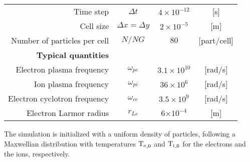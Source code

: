\begin{table}[htbp]
\begin{tabular}{@{}r c c c@{}}
          Time step & $\Delta t  $                      & $4 \times 10^{-12}$ & [{s}] \\
          Cell size & $\Delta x = \Delta y$ & $2 \times 10^{-5}$  & [{m}] \\
          Number of particles per cell & $N/NG      $                      & $80$                & [{part/cell}] \\
          \midrule
          {\bf Typical quantities} &  &  &  \\ 
          Electron plasma frequency & $\omega_{pe}$               & $3.1 \times 10^{10} $  & [rad/s]\\
          Ion plasma frequency & $\omega_{pi}$               & $36 \times 10^{6} $  & [rad/s]\\
          Electron cyclotron frequency & $\omega_{ce}$               &  $3.5\times 10^{9}$  & [rad/s] \\
          Electron Larmor radius & $r_{Le}$                    & 6$\times 10^{-4}$    & [m] \\
          \bottomrule
       \end{tabular}
    \end{table}
    
  
  The simulation is initialized with a uniform density of particles, following a Maxwellian distribution with temperatures $\mathrm{T_e}_{,0}$ and $\mathrm{T_i}_{,0}$ for the electrons and the ions, respectively.
  
  